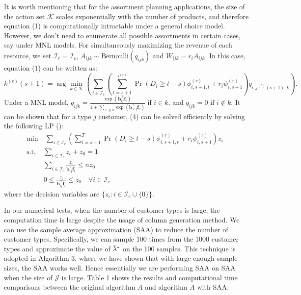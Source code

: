 \documentclass[letterpaper, 10 pt, conference]{ieeeconf}  %
\newcommand{\III}{\mathcal{I}}
\newcommand{\JJJ}{\mathcal{J}}
\newcommand{\KKK}{\mathcal{K}}
\theoremstyle{plain}
\theoremstyle{definition}
\theoremstyle{remark}
\begin{document}
It is worth mentioning that for the assortment planning applications, the size of the action set $\KKK$ scales exponentially with the number of products, and therefore equation (1) is computationally intractable under a general choice model. However, we don't need to enumerate all possible assortments in certain cases, say under MNL models. For simultaneously maximizing the revenue of each resource, we set $\III_r=\III_c$, $A_{ijk} \sim \text{Bernoulli} (q_{ijk})$ and $W_{ijk} = r_i A_{ijk}$. In this case, equation (1) can be written as:
\begin{equation}
k^{(r)}(s+1)=\arg \min \limits_{k \in \KKK } \left(\sum_{i \in \III_c} \left(\sum^{t^{(r)}}_{t=s+1} \Pr( D_i \geq t-s) \phi^{(r)}_{i,s+1,t} + r_i \psi^{(r)}_{i,s+1}\right) q_{i,j^{(r)}(s+1),k} \right). \tag{4}
\end{equation}
Under a MNL model, $q_{ijk} = \frac{\exp(\boldsymbol{b}_{ij}^\top \boldsymbol{f}_i)}{1+\sum_{\ell \in k} \exp(\boldsymbol{b}_{\ell j}^\top \boldsymbol{f}_\ell)}$ if $i\in k$, and $q_{ijk} = 0$ if $i\not \in k$. It can be shown that for a type $j$ customer, (4) can be solved efficiently by solving the following LP (\cite{davis2013assortment}):
\begin{align}
\min  &~\sum_{i \in \III_c}  \left(\sum^T_{t=s+1} \Pr( D_i \geq t-s) \phi^{(r)}_{i,s+1,t} +  r_i \psi^{(r)}_{i,s+1}\right) z_i & \nonumber\\
\text{s.t.}  & \sum_{i \in \III_c} z_i + z_0 = 1   \nonumber\\
& \sum_{i \in \III_c} \frac{z_i}{\boldsymbol{b}_{ij}^\top \boldsymbol{f}_i} \leq n z_0 \nonumber\\
& 0 \leq \frac{z_i}{\boldsymbol{b}_{ij}^\top \boldsymbol{f}_i} \leq z_0 \quad \forall i\in \III_c \nonumber
\end{align}
where the decision variables are $\{z_i: i \in \III_c \cup \{0\}\}$. 

In our numerical tests, when the number of customer types is large, the computation time is large despite the usage of column generation method. We can use the sample average approximation (SAA) to reduce the number of customer types. Specifically, we can sample 100 times from the 1000 customer types and approximate the value of $\Tilde{\lambda}^*$ on the 100 samples. This technique is adopted in Algorithm 3, where we have shown that with large enough sample sizes, the SAA works well. Hence essentially we are performing SAA on SAA when the size of $\JJJ$ is large. Table 1 shows the results and computational time comparisons between the original algorithm $A$ and algorithm $A$ with SAA.
\end{document}
